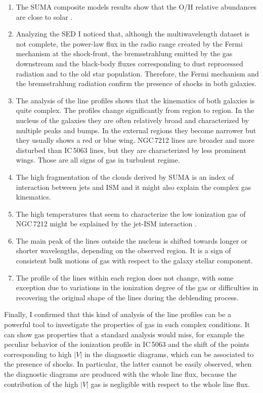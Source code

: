 \documentclass[../main.tex]{subfiles}
\begin{document}
\begin{enumerate}
\item The SUMA composite models results show that the O/H relative abundances are close to solar \citep{Allen76}.

\item Analyzing the SED I noticed that, although the multiwavelength dataset is not complete, the power-law flux in the radio range created by the Fermi mechanism at the shock-front, the bremsstrahlung emitted by the gas downstream and the black-body fluxes corresponding to dust reprocessed radiation and to the old star population.
Therefore, the Fermi mechanism and the bremsstrahlung radiation confirm the presence of shocks in both galaxies.

\item The analysis of the line profiles shows that the kinematics of both galaxies is quite complex.
The profiles change significantly from region to region. 
In the nucleus of the galaxies they are often relatively broad and characterized by multiple peaks and bumps. 
In the external regions they become narrower but they usually shows a red or blue wing.
NGC\,7212 lines are broader and more disturbed than IC\,5063 lines, but they are characterized by less prominent wings.
Those are all signs of gas in turbulent regime.

\item The high fragmentation of the clouds derived by SUMA is an index of interaction between jets and ISM and it might also explain the complex gas kinematics.

\item The high temperatures that seem to characterize the low ionization gas of NGC\,7212 might be explained by the jet-ISM interaction \citep{Roche16}.

\item The main peak of the lines outside the nucleus is shifted towards longer or shorter wavelengths, depending on the observed region.
It is a sign of consistent bulk motions of gas with respect to the galaxy stellar component.

\item The profile of the lines within each region does not change, with some exception due to variations in the ionization degree of the gas or difficulties in recovering the original shape of the lines during the deblending process.
\end{enumerate}

Finally, I confirmed that this kind of analysis of the line profiles can be a powerful tool to investigate the properties of gas in such complex conditions.
It can show  gas properties that a standard analysis would miss, for example the peculiar behavior of the ionization profile in IC\,5063 and the shift of the points corresponding to high $\lvert V\rvert$ in the diagnostic diagrams, which can be associated to the presence of shocks.
In particular, the latter cannot be easily observed, when the diagnostic diagrams are produced with the whole line flux, because the contribution of the high $\lvert V\rvert$ gas is negligible with respect to the whole line flux.
\end{document}
